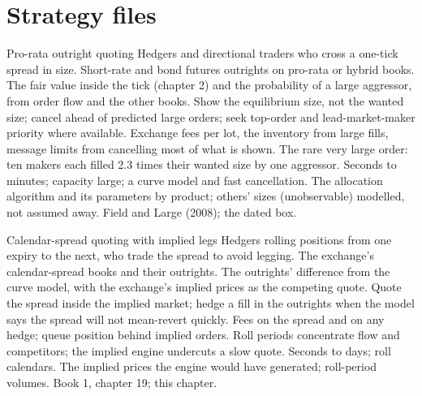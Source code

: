 \section{Strategy files}

\begin{strategyfile}{Pro-rata outright quoting}\label{strat:hf:futures-market-making:prorata}
 Hedgers and directional traders who cross a one-tick spread in size.
 Short-rate and bond futures outrights on pro-rata or hybrid books.
 The fair value inside the tick (chapter 2) and the probability of a large aggressor, from order flow and the other books.
 Show the equilibrium size, not the wanted size; cancel ahead of predicted large orders; seek top-order and lead-market-maker
priority where available.
 Exchange fees per lot, the inventory from large fills, message limits from cancelling most of what is shown.
 The rare very large order: ten makers each filled 2.3 times their wanted size by one aggressor.
 Seconds to minutes; capacity large; a curve model and fast cancellation.
 The allocation algorithm and its parameters by product; others' sizes (unobservable) modelled, not assumed away.
 Field and Large (2008); the dated box.
\end{strategyfile}

\begin{strategyfile}{Calendar-spread quoting with implied legs}\label{strat:hf:futures-market-making:spread}
 Hedgers rolling positions from one expiry to the next, who trade the spread to avoid legging.
 The exchange's calendar-spread books and their outrights.
 The outrights' difference from the curve model, with the exchange's implied prices as the competing quote.
 Quote the spread inside the implied market; hedge a fill in the outrights when the model says the spread will not
mean-revert quickly.
 Fees on the spread and on any hedge; queue position behind implied orders.
 Roll periods concentrate flow and competitors; the implied engine undercuts a slow quote.
 Seconds to days; roll calendars.
 The implied prices the engine would have generated; roll-period volumes.
 Book 1, chapter 19; this chapter.
\end{strategyfile}

